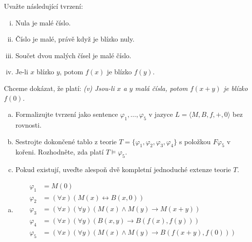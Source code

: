 \begin{problem}
\begin{solution}
    \end{solution}

\end{problem} 
    

\begin{problem}

    Uvažte následující tvrzení:
    \begin{enumerate}[(i)] \it 
        \item Nula je malé číslo.
        \item Číslo je malé, právě když je blízko nuly.
        \item Součet dvou malých čísel je malé číslo.
        \item Je-li $x$ blízko $y$, potom $f(x)$ je blízko $f(y)$.
    \end{enumerate}

    Chceme dokázat, že platí: {\it (v) Jsou-li $x$ a $y$ malá čísla, potom $f(x+y)$ je blízko $f(0)$.}

    \begin{enumerate}[(a)]
        \item Formalizujte tvrzení jako sentence $\varphi_1,\dots,\varphi_5$ v jazyce $L=\langle M,B,f,+,0\rangle$ bez rovnosti.        
        \item Sestrojte dokončené tablo z teorie $T=\{\varphi_1,\varphi_2,\varphi_3,\varphi_4\}$ s položkou $F\varphi_5$ v kořeni. Rozhodněte, zda platí $T\models \varphi_5$.
        \item Pokud existují, uveďte alespoň dvě kompletní jednoduché extenze teorie $T$.
    \end{enumerate}

    \begin{solution}

        \begin{enumerate}[(a)]
            \item \begin{align*}
                \varphi_1 & = M(0) \\
                \varphi_2 & = (\forall x)(M(x)\leftrightarrow B(x,0)) \\
                \varphi_3 & = (\forall x)(\forall y)(M(x)\wedge M(y)\to M(x+y)) \\
                \varphi_4 & = (\forall x)(\forall y)(B(x,y)\to B(f(x),f(y))) \\
                \varphi_5 & = (\forall x)(\forall y)(M(x)\wedge M(y)\to B(f(x+y),f(0)))
            \end{align*}


\end{enumerate}
\end{solution}
\end{problem}
